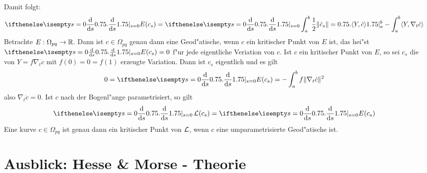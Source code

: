 Damit folgt:
\begin{align*}
	\difffrac[s=0]{}{s} E(c_s) = \difffrac[s=0]{}{s} \int_a^b \frac{1}{2} \|\dot c_s\| = \left. \langle Y, \dot c \rangle \right|_a^b - \int_a^b \langle Y, \nabla_t \dot c \rangle
\end{align*}
Betrachte $E: \Omega_{pq} \to \operatorname{\mathbb{R}}$. Dann ist $c \in \Omega_{pq}$ genau dann eine Geod"atische, wenn $c$ ein kritischer Punkt von $E$ ist, das hei"st $\difffrac[s=0]{}{s}E(c_s) = 0$ f"ur jede eigentliche Veriation von $c$.
Ist $c$ ein kritischer Punkt von $E$, so sei $c_s$ die von $Y = f \nabla_t \dot c$ mit $f(0) = 0 = f(1)$ erzeugte Variation.
Dann ist $c_s$ eigentlich und es gilt
\begin{align*}
	0 = \difffrac[s=0]{}{s} E(c_s) = - \int_a^b f \|\nabla_t \dot c\|^2
\end{align*}
also $\nabla_t \dot c = 0$.
Ist $c$ nach der Bogenl"ange parametrisiert, so gilt
\begin{align*}
	\difffrac[s=0]{}{s} \calL(c_s) = \difffrac[s=0]{}{s} E(c_s)
\end{align*}
Eine kurve $c \in \Omega_{pq}$ ist genau dann ein kritischer Punkt von $\operatorname{\mathcal{L}}$, wenn $c$ eine umparametrisierte Geod"atische ist.

\section{Ausblick: Hesse \& Morse - Theorie}

